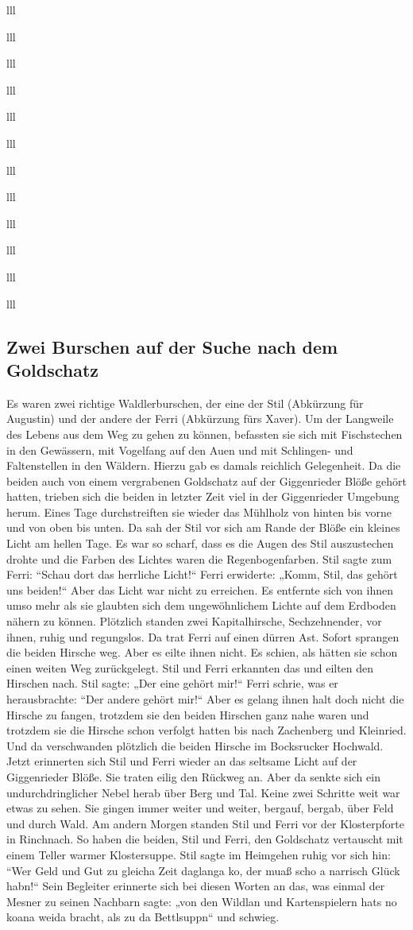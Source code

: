 \documentclass[12pt,a4pager]{book}
\begin{document}
\begin{tabuluar}{lll}
\begin{tabuluar}{lll}
\begin{tabuluar}{lll}
\begin{tabuluar}{lll}
\begin{tabuluar}{lll}
\begin{tabuluar}{lll}
\begin{tabuluar}{lll}
\begin{tabuluar}{lll}
\begin{tabuluar}{lll}
\begin{tabuluar}{lll}
\begin{tabuluar}{lll}
\begin{tabuluar}{lll}
\subsection{Zwei Burschen auf der Suche nach dem Goldschatz}

Es waren zwei richtige Waldlerburschen, der eine der Stil (Abkürzung für
Augustin) und der andere der Ferri (Abkürzung fürs Xaver). Um der Langweile des
Lebens aus dem Weg zu gehen zu können, befassten sie sich mit Fischstechen in
den Gewässern, mit Vogelfang auf den Auen und mit Schlingen- und Faltenstellen
in den Wäldern. Hierzu gab es damals reichlich Gelegenheit. Da die beiden auch
von einem vergrabenen Goldschatz auf der Giggenrieder Blöße gehört hatten,
trieben sich die beiden in letzter Zeit viel in der Giggenrieder Umgebung herum.
Eines Tage durchstreiften sie wieder das Mühlholz von hinten bis vorne und von
oben bis unten. Da sah der Stil vor sich am Rande der Blöße ein kleines Licht am
hellen Tage. Es war so scharf, dass es die Augen des Stil auszustechen drohte
und die Farben des Lichtes waren die Regenbogenfarben. Stil sagte zum Ferri:
“Schau dort das herrliche Licht!“ Ferri erwiderte: „Komm, Stil, das gehört uns
beiden!“ Aber das Licht war nicht zu erreichen. Es entfernte sich von ihnen umso
mehr als sie glaubten sich dem ungewöhnlichem Lichte auf dem Erdboden nähern zu
können. Plötzlich standen zwei Kapitalhirsche, Sechzehnender, vor ihnen, ruhig
und regungslos. Da trat Ferri auf einen dürren Ast. Sofort sprangen die beiden
Hirsche weg. Aber es eilte ihnen nicht. Es schien, als hätten sie schon einen
weiten Weg zurückgelegt. Stil und Ferri erkannten das und eilten den Hirschen
nach. Stil sagte: „Der eine gehört mir!“ Ferri schrie, was er herausbrachte:
“Der andere gehört mir!“ Aber es gelang ihnen halt doch nicht die Hirsche zu
fangen, trotzdem sie den beiden Hirschen ganz nahe waren und trotzdem sie die
Hirsche schon verfolgt hatten bis nach Zachenberg und Kleinried. Und da
verschwanden plötzlich die beiden Hirsche im Bocksrucker Hochwald. Jetzt
erinnerten sich Stil und Ferri wieder an das seltsame Licht auf der Giggenrieder
Blöße. Sie traten eilig den Rückweg an. Aber da senkte sich ein
undurchdringlicher Nebel herab über Berg und Tal. Keine zwei Schritte weit war
etwas zu sehen. Sie gingen immer weiter und weiter, bergauf, bergab, über Feld
und durch Wald. Am andern Morgen standen Stil und Ferri vor der Klosterpforte in
Rinchnach. So haben die beiden, Stil und Ferri, den Goldschatz vertauscht mit
einem Teller warmer Klostersuppe. Stil sagte im Heimgehen ruhig vor sich hin:
“Wer Geld und Gut zu gleicha Zeit daglanga ko, der muaß scho a narrisch Glück
habn!“ Sein Begleiter erinnerte sich bei diesen Worten an das, was einmal der
Mesner zu seinen Nachbarn sagte: „von den Wildlan und Kartenspielern hats no
koana weida bracht, als zu da Bettlsuppn“ und schwieg.


\end{tabuluar}
\end{tabuluar}
\end{tabuluar}
\end{tabuluar}
\end{tabuluar}
\end{tabuluar}
\end{tabuluar}
\end{tabuluar}
\end{tabuluar}
\end{tabuluar}
\end{tabuluar}
\end{tabuluar}
\end{document}
